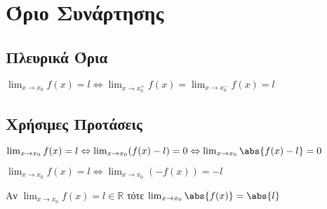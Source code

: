 



\newcommand{\twocolumnsidesch}[2]{\begin{minipage}[c]{0.45\linewidth}\raggedright
    #1
    \end{minipage}\hfill\begin{minipage}[c]{0.45\linewidth}\raggedright
    #2
\end{minipage}}

\everymath{\displaystyle}
\pagestyle{askhseis}




\begin{center}
  \minibox{\large\bfseries \textcolor{Col1}{Θεωρία - Συνοπτικά}}
\end{center}

\vspace{\baselineskip}

\section*{Όριο Συνάρτησης}

\subsection*{Πλευρικά Όρια}

\begin{prop}
  $ \lim_{x \to x_{0}} f(x) = l \Leftrightarrow \lim_{x \to x_{0}^{+}} f(x) =
  \lim_{x \to x_{0}^{-}} f(x) = l $
\end{prop}

\subsection*{Χρήσιμες Προτάσεις}

\begin{prop}
  $
    \lim_{x \to x_{0}} f(x) = l \Leftrightarrow \lim_{x \to x_{0}} (f(x)-l)=0
    \Leftrightarrow \lim_{x \to x_{0}} \abs{f(x)-l} = 0 
  $
\end{prop}

\begin{prop}
  $ \lim_{x \to x_{0}} f(x)=l \Leftrightarrow \lim_{x \to x_{0}} (-f(x)) = -l $
\end{prop}

\begin{prop}
  Αν $ \lim_{x \to x_{0}} f(x) = l \in \mathbb{R} $ τότε 
  $ \lim_{x \to x_{0}} \abs{f(x)} = \abs{l} $ 
\end{prop}

